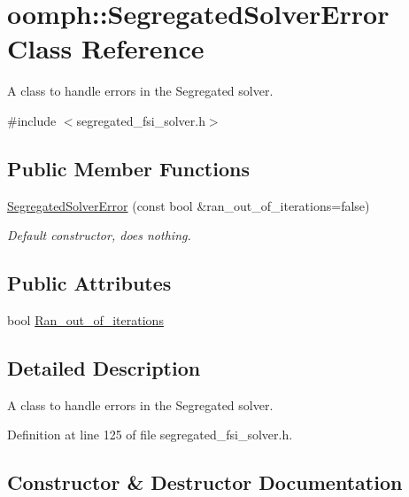\hypertarget{classoomph_1_1SegregatedSolverError}{}\section{oomph\+:\+:Segregated\+Solver\+Error Class Reference}
\label{classoomph_1_1SegregatedSolverError}


A class to handle errors in the Segregated solver.  




{\ttfamily \#include $<$segregated\+\_\+fsi\+\_\+solver.\+h$>$}

\subsection*{Public Member Functions}
\begin{DoxyCompactItemize}
\item 
\hyperlink{classoomph_1_1SegregatedSolverError_a047930f506d1060fef2f6746755248b7}{Segregated\+Solver\+Error} (const bool \&ran\+\_\+out\+\_\+of\+\_\+iterations=false)
\begin{DoxyCompactList}\small\item\em Default constructor, does nothing. \end{DoxyCompactList}\end{DoxyCompactItemize}
\subsection*{Public Attributes}
\begin{DoxyCompactItemize}
\item 
bool \hyperlink{classoomph_1_1SegregatedSolverError_ad3aa39f2cc87179429a16373f197f600}{Ran\+\_\+out\+\_\+of\+\_\+iterations}
\end{DoxyCompactItemize}


\subsection{Detailed Description}
A class to handle errors in the Segregated solver. 

Definition at line 125 of file segregated\+\_\+fsi\+\_\+solver.\+h.



\subsection{Constructor \& Destructor Documentation}
\mbox{\label{classoomph_1_1SegregatedSolverError_a047930f506d1060fef2f6746755248b7}} 
